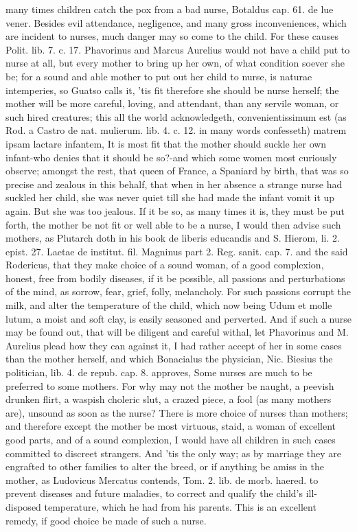 {many times children catch the pox from a bad nurse, Botaldus cap. 61.
de lue vener. Besides evil attendance, negligence, and many gross
inconveniences, which are incident to nurses, much danger may so come
to the child. For these causes \Aristotle Polit. lib. 7. c. 17.
Phavorinus and Marcus Aurelius would not have a child put to nurse at
all, but every mother to bring up her own, of what condition soever she
be; for a sound and able mother to put out her child to nurse, is
naturae intemperies, so Guatso calls it, 'tis fit therefore she
should be nurse herself; the mother will be more careful, loving, and
attendant, than any servile woman, or such hired creatures; this all
the world acknowledgeth, convenientissimum est (as Rod. a Castro de
nat. mulierum. lib. 4. c. 12. in many words confesseth) matrem ipsam
lactare infantem, It is most fit that the mother should suckle her own
infant-who denies that it should be so?-and which some women most
curiously observe; amongst the rest, that queen of France, a
Spaniard by birth, that was so precise and zealous in this behalf, that
when in her absence a strange nurse had suckled her child, she was
never quiet till she had made the infant vomit it up again. But she was
too jealous. If it be so, as many times it is, they must be put forth,
the mother be not fit or well able to be a nurse, I would then advise
such mothers, as Plutarch doth in his book de liberis educandis
and S. Hierom, li. 2. epist. 27. Laetae de institut. fil.
Magninus part 2. Reg. sanit. cap. 7. and the said Rodericus, that they
make choice of a sound woman, of a good complexion, honest, free from
bodily diseases, if it be possible, all passions and perturbations of
the mind, as sorrow, fear, grief, folly, melancholy. For such
passions corrupt the milk, and alter the temperature of the child,
which now being  Udum et molle lutum, a moist and soft clay, is
easily seasoned and perverted. And if such a nurse may be found out,
that will be diligent and careful withal, let Phavorinus and M.
Aurelius plead how they can against it, I had rather accept of her in
some cases than the mother herself, and which Bonacialus the physician,
Nic. Biesius the politician, lib. 4. de repub. cap. 8. approves,
Some nurses are much to be preferred to some mothers. For why may
not the mother be naught, a peevish drunken flirt, a waspish choleric
slut, a crazed piece, a fool (as many mothers are), unsound as soon as
the nurse? There is more choice of nurses than mothers; and therefore
except the mother be most virtuous, staid, a woman of excellent good
parts, and of a sound complexion, I would have all children in such
cases committed to discreet strangers. And 'tis the only way; as by
marriage they are engrafted to other families to alter the breed, or if
anything be amiss in the mother, as Ludovicus Mercatus contends, Tom.
2. lib. de morb. haered. to prevent diseases and future maladies, to
correct and qualify the child's ill-disposed temperature, which he had
from his parents. This is an excellent remedy, if good choice be made
of such a nurse.

}
